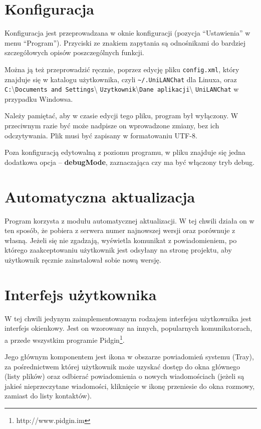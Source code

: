 \documentclass[11pt,leqno]{article}
\begin{document}
\section{Konfiguracja}

Konfiguracja jest przeprowadzana w oknie konfiguracji (pozycja ``Ustawienia'' w menu ``Program'').
Przyciski ze znakiem zapytania są odnośnikami do bardziej szczegółowych opisów poszczególnych funkcji.

Można ją też przeprowadzić ręcznie, poprzez edycję pliku \texttt{config.xml}, który znajduje
się w katalogu użytkownika, czyli \texttt{\~{ }/.UniLANChat} dla Linuxa, oraz
\texttt{C:}\textbackslash \texttt{Documents and Settings}\textbackslash
\texttt{Uzytkownik}\textbackslash \texttt{Dane aplikacji}\textbackslash
\texttt{UniLANChat} w przypadku Windowsa.

Należy pamiętać, aby w czasie edycji tego pliku, program był wyłączony. W przeciwnym razie być może
nadpisze on wprowadzone zmiany, bez ich odczytywania. Plik musi być zapisany w formatowaniu UTF-8.

Poza konfiguracją edytowalną z poziomu programu, w pliku znajduje się jedna dodatkowa opcja --
\textbf{debugMode}, zaznaczająca czy ma być włączony tryb debug.

\section{Automatyczna aktualizacja}

Program korzysta z modułu automatycznej aktualizacji. W tej chwili działa on w ten sposób, że
pobiera z serwera numer najnowszej wersji oraz porównuje z własną. Jeżeli się nie zgadzają,
wyświetla komunikat z powiadomieniem, po którego zaakceptowaniu użytkownik jest odsyłany na stronę
projektu, aby użytkownik ręcznie zainstalował sobie nową wersję.

\section{Interfejs użytkownika}

W tej chwili jedynym zaimplementowanym rodzajem interfejsu użytkownika jest interfejs okienkowy.
Jest on wzorowany na innych, popularnych komunikatorach, a przede wszystkim programie
Pidgin\footnote{http://www.pidgin.im}.

Jego głównym komponentem jest ikona w obszarze powiadomień systemu (Tray), za pośrednictwem której
użytkownik może uzyskać dostęp do okna głównego (listy plików) oraz odbierać powiadomienia o nowych
wiadomościach (jeżeli są jakieś nieprzeczytane wiadomości, kliknięcie w ikonę przeniesie do okna
rozmowy, zamiast do listy kontaktów).
\end{document}
